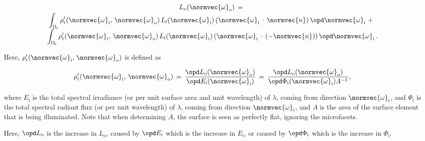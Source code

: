 \begin{equation} \label{eq:rendering_equation_reduced_rhor_rhot}
\renewcommand*{\arraystretch}{1.5}
\begin{array}{cl}
L_{\text{o}}(\normvec{\omega}_{\text{o}}) \,= \\
\displaystyle \int_{\Omega_{\text{r}}} \rho'_{\text{r}}(\normvec{\omega}_{\text{i}},\, \normvec{\omega}_{\text{o}})\, L_{\text{i}}(\normvec{\omega}_{\text{i}})\, (\normvec{\omega}_{\text{i}}\,\cdot\,\normvec{n})\, \opd \normvec{\omega}_{\text{i}} \ + \\[1ex]
\displaystyle \int_{\Omega_{\text{t}}} \rho'_{\text{t}}(\normvec{\omega}_{\text{i}},\, \normvec{\omega}_{\text{o}})\, L_{\text{i}}(\normvec{\omega}_{\text{i}})\, (\normvec{\omega}_{\text{i}}\,\cdot\,(-\normvec{n}))\, \opd \normvec{\omega}_{\text{i}} & \!\!\!\!\! .
\end{array}
\end{equation}

Here, $\rho'_{\text{r}}(\normvec{\omega}_{\text{i}},\, \normvec{\omega}_{\text{o}})$ is defined as

\begin{equation} \label{eq:brdf_definition}
\rho'_{\text{r}}(\normvec{\omega}_{\text{i}},\, \normvec{\omega}_{\text{o}}) \,=\, \frac{\opd L_{\text{o}}(\normvec{\omega}_{\text{o}})}{\opd E_{\text{i}}(\normvec{\omega}_{\text{i}})} \,=\, \frac{\opd L_{\text{o}}(\normvec{\omega}_{\text{o}})}{\opd \Phi_{\text{i}}(\normvec{\omega}_{\text{i}})A^{-1}},
\end{equation}

where $E_{\text{i}}$ is the total spectral irradiance (or  per unit surface area and unit wavelength) of  $\lambda$, coming from direction $\normvec{\omega}_{\text{i}}$, and $\Phi_{\text{i}}$ is the total spectral radiant flux (or  per unit wavelength) of  $\lambda$, coming from direction $\normvec{\omega}_{\text{i}}$, and $A$ is the area of the surface element that is being illuminated. Note that when determining $A$, the surface is seen as perfectly flat, ignoring the microfacets.

Here, $\opd L_{\text{o}}$ is the \infinitesimal increase in $L_{\text{o}}$, caused by $\opd E_{\text{i}}$ which is the \infinitesimal increase in $E_{\text{i}}$, or caused by $\opd \Phi_{\text{i}}$ which is the \infinitesimal increase in $\Phi_{\text{i}}$. 

